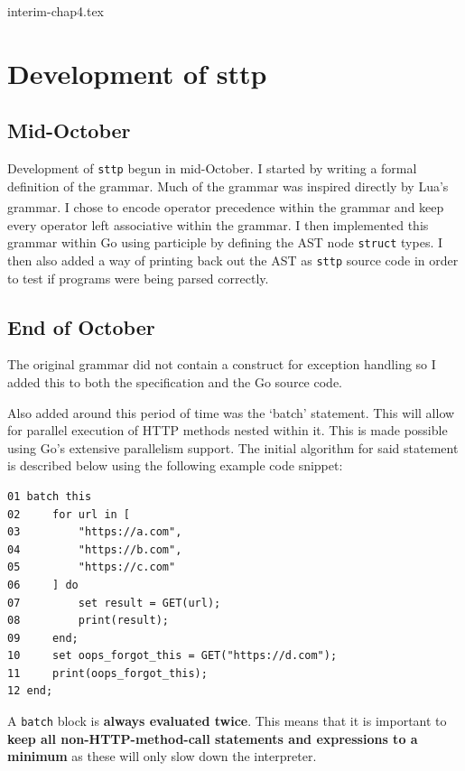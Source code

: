 \documentclass[]{interim}
\theoremstyle{definition}
\begin{document}
{interim-chap4.tex}

\chapter{Development of sttp}

\section{Mid-October}

Development of \verb|sttp| begun in mid-October. I started by writing a formal definition of the grammar. Much of the grammar was inspired directly by Lua's grammar\textsuperscript{\cite{ierusalimschy_henrique-de-figueiredo_celes_2020}}. I chose to encode operator precedence within the grammar and keep every operator left associative within the grammar. I then implemented this grammar within Go using participle by defining the AST node \verb|struct| types. I then also added a way of printing back out the AST as \verb|sttp| source code in order to test if programs were being parsed correctly.

\section{End of October}

The original grammar did not contain a construct for exception handling so I added this to both the specification and the Go source code.

Also added around this period of time was the `batch' statement. This will allow for parallel execution of HTTP methods nested within it. This is made possible using Go's extensive parallelism support. The initial algorithm for said statement is described below using the following example code snippet:

\begin{center}
    \begin{verbatim}
01 batch this
02     for url in [
03         "https://a.com",
04         "https://b.com",
05         "https://c.com"
06     ] do
07         set result = GET(url);
08         print(result);
09     end;
10     set oops_forgot_this = GET("https://d.com");
11     print(oops_forgot_this);
12 end;
    \end{verbatim}
\end{center}

A \verb|batch| block is \textbf{always evaluated twice}. This means that it is important to \textbf{keep all non-HTTP-method-call statements and expressions to a minimum} as these will only slow down the interpreter.
\end{document}
